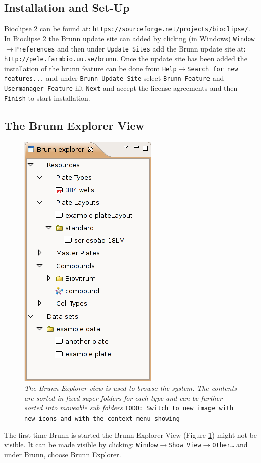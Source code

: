 \documentclass[a4paper,10pt]{article}
\begin{document}
         \subsection{Installation and Set-Up}
            Bioclipse 2 can be found at:
            \texttt{https://sourceforge.net/projects/bioclipse/}. In Bioclipse
            2 the Brunn update site can added by clicking (in Windows)
            \texttt{Window$\rightarrow$Preferences} and then under
            \texttt{Update Sites} add the Brunn update site at:
            \texttt{http://pele.farmbio.uu.se/brunn}. Once the update site has
            been added the installation of the brunn feature can be done from
            \texttt{Help$\rightarrow$Search for new features...} and under
            \texttt{Brunn Update Site} select \texttt{Brunn Feature} and
            \texttt{Usermanager Feature} hit \texttt{Next} and accept the
            license agreements and then \texttt{Finish} to start installation. 

         \subsection{The Brunn Explorer View} 
            \begin{figure}
                \begin{center}
                    \includegraphics[width=.2\textwidth]
                                    {images/explorerView.png}
                \end{center}
                \caption{\textit{The Brunn Explorer view is used to browse the
                    system. The contents are sorted in fixed super folders for
                    each type and can be further sorted into moveable sub
                    folders } \texttt{TODO: Switch to new image with new icons
                    and with the context menu showing}}
                \label{explorerView}
            \end{figure}

            \noindent
            The first time Brunn is started the Brunn Explorer View (Figure
            \ref{explorerView}) might not be visible. It can be made visible by
            clicking: \texttt{Window$\rightarrow$Show
            View$\rightarrow$Other\ldots} and under Brunn, choose Brunn
            Explorer. 
\end{document}
